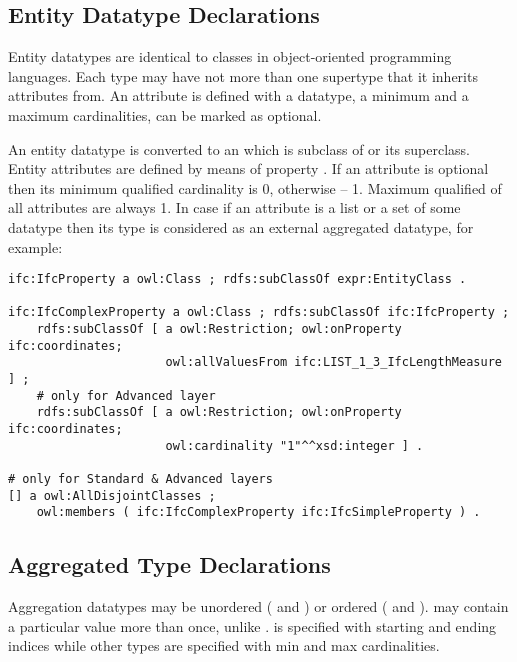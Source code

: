 \subsection{Entity Datatype Declarations}
\label{subsec:ifcOWL-entity-types}

Entity data\-types are identical to classes in object-oriented programming languages. Each type may have not more than one super\-type that it inherits attributes from. An attribute is defined with a data\-type, a minimum and a maximum cardinalities, can be marked as optional.

\begin{ontologyRule}An entity data\-type is converted to an  which is subclass of  or its superclass. Entity attributes are defined by means of property . If an attribute is optional then its minimum qualified cardinality is 0, otherwise -- 1. Maximum qualified of all attributes are always 1. In case if an attribute is a list or a set of some data\-type then its type is considered as an external aggregated data\-type, for example:
\begin{lstlisting}
ifc:IfcProperty a owl:Class ; rdfs:subClassOf expr:EntityClass .

ifc:IfcComplexProperty a owl:Class ; rdfs:subClassOf ifc:IfcProperty ;
    rdfs:subClassOf [ a owl:Restriction; owl:onProperty ifc:coordinates;
                      owl:allValuesFrom ifc:LIST_1_3_IfcLengthMeasure ] ;
    # only for Advanced layer
    rdfs:subClassOf [ a owl:Restriction; owl:onProperty ifc:coordinates;
                      owl:cardinality "1"^^xsd:integer ] .

# only for Standard & Advanced layers
[] a owl:AllDisjointClasses ;
    owl:members ( ifc:IfcComplexProperty ifc:IfcSimpleProperty ) .
\end{lstlisting}
\end{ontologyRule}


\subsection{Aggregated Type Declarations}
\label{subsec:ifcOWL-aggregated-types}

Aggregation data\-types may be unordered ( and ) or  ordered ( and ).  may contain a particular value more than once, unlike .  is specified with starting and ending indices while other types are specified with min and max cardinalities.

